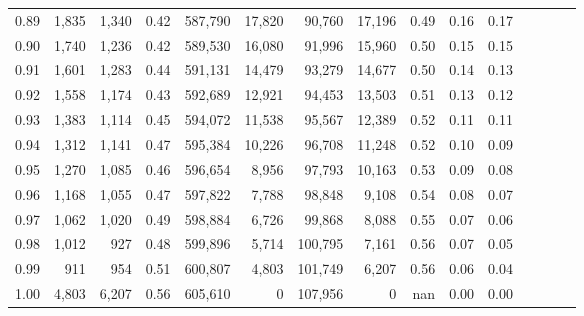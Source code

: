 \begin{tabular}{rrrcrrrrrrrrrrr}
0.89 &   1,835 &  1,340 &                                       0.42 &  587,790 &   17,820 &   90,760 &   17,196 &  0.49 &  0.16 &                         0.17 \\
0.90 &   1,740 &  1,236 &                                       0.42 &  589,530 &   16,080 &   91,996 &   15,960 &  0.50 &  0.15 &                         0.15 \\
0.91 &   1,601 &  1,283 &                                       0.44 &  591,131 &   14,479 &   93,279 &   14,677 &  0.50 &  0.14 &                         0.13 \\
0.92 &   1,558 &  1,174 &                                       0.43 &  592,689 &   12,921 &   94,453 &   13,503 &  0.51 &  0.13 &                         0.12 \\
0.93 &   1,383 &  1,114 &                                       0.45 &  594,072 &   11,538 &   95,567 &   12,389 &  0.52 &  0.11 &                         0.11 \\
0.94 &   1,312 &  1,141 &                                       0.47 &  595,384 &   10,226 &   96,708 &   11,248 &  0.52 &  0.10 &                         0.09 \\
0.95 &   1,270 &  1,085 &                                       0.46 &  596,654 &    8,956 &   97,793 &   10,163 &  0.53 &  0.09 &                         0.08 \\
0.96 &   1,168 &  1,055 &                                       0.47 &  597,822 &    7,788 &   98,848 &    9,108 &  0.54 &  0.08 &                         0.07 \\
0.97 &   1,062 &  1,020 &                                       0.49 &  598,884 &    6,726 &   99,868 &    8,088 &  0.55 &  0.07 &                         0.06 \\
0.98 &   1,012 &    927 &                                       0.48 &  599,896 &    5,714 &  100,795 &    7,161 &  0.56 &  0.07 &                         0.05 \\
0.99 &     911 &    954 &                                       0.51 &  600,807 &    4,803 &  101,749 &    6,207 &  0.56 &  0.06 &                         0.04 \\
1.00 &   4,803 &  6,207 &                                       0.56 &  605,610 &        0 &  107,956 &        0 &   nan &  0.00 &                         0.00 \\
\bottomrule
\end{tabular}
